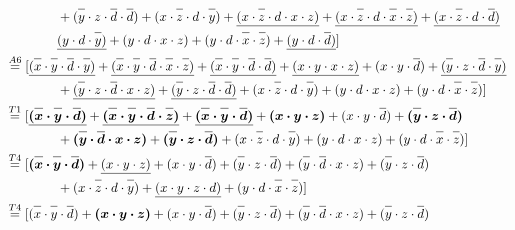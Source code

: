 \documentclass{article}
\newcommand*{\oline}[1]{\overline{#1\mathstrut}}
\newcommand{\bigspace}{\quad\quad\quad\quad}
\begin{document}
\begin{align*}
&\bigspace + (\oline{y} \cdot z \cdot \oline{d} \cdot \oline{d} ) + (x \cdot \oline{z} \cdot d \cdot \oline{y}) + \underline{(x \cdot \oline{z} \cdot d \cdot x \cdot z )} + \underline{(x \cdot \oline{z} \cdot d \cdot \oline{x} \cdot \oline{z})} + \underline{(x \cdot \oline{z} \cdot d \cdot \oline{d} )}\\
&\bigspace \underline{(y \cdot d \cdot \oline{y})} + (y \cdot d \cdot x \cdot z) + (y \cdot d \cdot \oline{x} \cdot \oline{z}) + \underline{(y \cdot d \cdot \oline{d})}]\\
&\overset{A6}{=} [\underline{(\oline{x} \cdot \oline{y} \cdot \oline{d} \cdot \oline{y} )}  + \underline{(\oline{x} \cdot \oline{y} \cdot \oline{d} \cdot \oline{x}  \cdot \oline{z} )} + \underline{(\oline{x} \cdot \oline{y} \cdot \oline{d} \cdot \oline{d} )} + \underline{(x \cdot y \cdot x \cdot z )} + (x \cdot y \cdot \oline{d}) + \underline{(\oline{y} \cdot z \cdot \oline{d} \cdot \oline{y} )}  \\
&\bigspace  + \underline{(\oline{y} \cdot z \cdot \oline{d} \cdot x \cdot z)} + \underline{(\oline{y} \cdot z \cdot \oline{d} \cdot \oline{d} )} + (x \cdot \oline{z} \cdot d \cdot \oline{y})+ (y \cdot d \cdot x \cdot z) + (y \cdot d \cdot \oline{x} \cdot \oline{z})]\\
&\overset{T1}{=} [\bm{\underline{(\oline{x} \cdot \oline{y} \cdot \oline{d})}}  + \bm{\underline{(\oline{x} \cdot \oline{y} \cdot \oline{d} \cdot \oline{z} )}} + \bm{\underline{(\oline{x} \cdot \oline{y} \cdot \oline{d})}} + \bm{(x \cdot y \cdot z )} + (x \cdot y \cdot \oline{d}) + \bm{(\oline{y} \cdot z \cdot \oline{d})}  \\
&\bigspace  + \bm{(\oline{y} \cdot \oline{d} \cdot x \cdot z)} + \bm{(\oline{y} \cdot z \cdot \oline{d} )} + (x \cdot \oline{z} \cdot d \cdot \oline{y})+ (y \cdot d \cdot x \cdot z) + (y \cdot d \cdot \oline{x} \cdot \oline{z})]\\
&\overset{T4}{=} [\bm{(\oline{x} \cdot \oline{y} \cdot \oline{d})} + \underline{(x \cdot y \cdot z )} + (x \cdot y \cdot \oline{d}) + (\oline{y} \cdot z \cdot \oline{d}) + (\oline{y} \cdot \oline{d} \cdot x \cdot z) + (\oline{y} \cdot z \cdot \oline{d} ) \\
&\bigspace  + (x \cdot \oline{z} \cdot d \cdot \oline{y})+ \underline{(x \cdot y \cdot z \cdot d)} + (y \cdot d \cdot \oline{x} \cdot \oline{z})] \\
&\overset{T4}{=} [(\oline{x} \cdot \oline{y} \cdot \oline{d}) + \bm{(x \cdot y \cdot z )} + (x \cdot y \cdot \oline{d}) + (\oline{y} \cdot z \cdot \oline{d}) + (\oline{y} \cdot \oline{d} \cdot x \cdot z) + (\oline{y} \cdot z \cdot \oline{d} ) \\

\end{align*}
\end{document}
